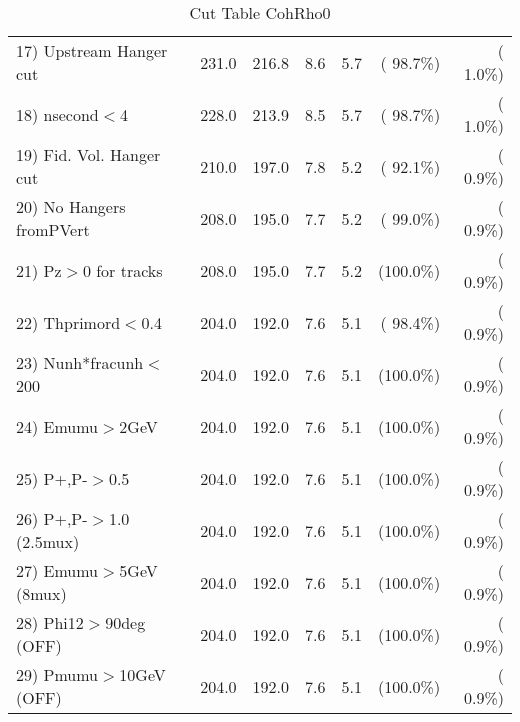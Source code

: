 \begin{table}[h!]
\begin{tabular}{||l||r|r|r|r|r|r||}
 17) Upstream Hanger cut  &        231.0 &        216.8 &          8.6 &          5.7 & ( 98.7\%) & (  1.0\%) \\
 18) nsecond$<$4          &        228.0 &        213.9 &          8.5 &          5.7 & ( 98.7\%) & (  1.0\%) \\
 19) Fid. Vol. Hanger cut &        210.0 &        197.0 &          7.8 &          5.2 & ( 92.1\%) & (  0.9\%) \\
 20) No Hangers fromPVert &        208.0 &        195.0 &          7.7 &          5.2 & ( 99.0\%) & (  0.9\%) \\
 21) Pz$>$0 for tracks    &        208.0 &        195.0 &          7.7 &          5.2 & (100.0\%) & (  0.9\%) \\
 22) Thprimord$<$0.4      &        204.0 &        192.0 &          7.6 &          5.1 & ( 98.4\%) & (  0.9\%) \\
 23) Nunh*fracunh$<$200   &        204.0 &        192.0 &          7.6 &          5.1 & (100.0\%) & (  0.9\%) \\
 24) Emumu$>$2GeV         &        204.0 &        192.0 &          7.6 &          5.1 & (100.0\%) & (  0.9\%) \\
 25) P+,P-$>$0.5          &        204.0 &        192.0 &          7.6 &          5.1 & (100.0\%) & (  0.9\%) \\
 26) P+,P-$>$1.0 (2.5mux) &        204.0 &        192.0 &          7.6 &          5.1 & (100.0\%) & (  0.9\%) \\
 27) Emumu$>$5GeV  (8mux) &        204.0 &        192.0 &          7.6 &          5.1 & (100.0\%) & (  0.9\%) \\
 28) Phi12$>$90deg  (OFF) &        204.0 &        192.0 &          7.6 &          5.1 & (100.0\%) & (  0.9\%) \\
 29) Pmumu$>$10GeV  (OFF) &        204.0 &        192.0 &          7.6 &          5.1 & (100.0\%) & (  0.9\%) \\
 \hline
 \hline
 \end{tabular}
 \caption{Cut Table  CohRho0  }
 \label{tab-cutcohjpsi-mumu_cohrho0}
 \end{table}
